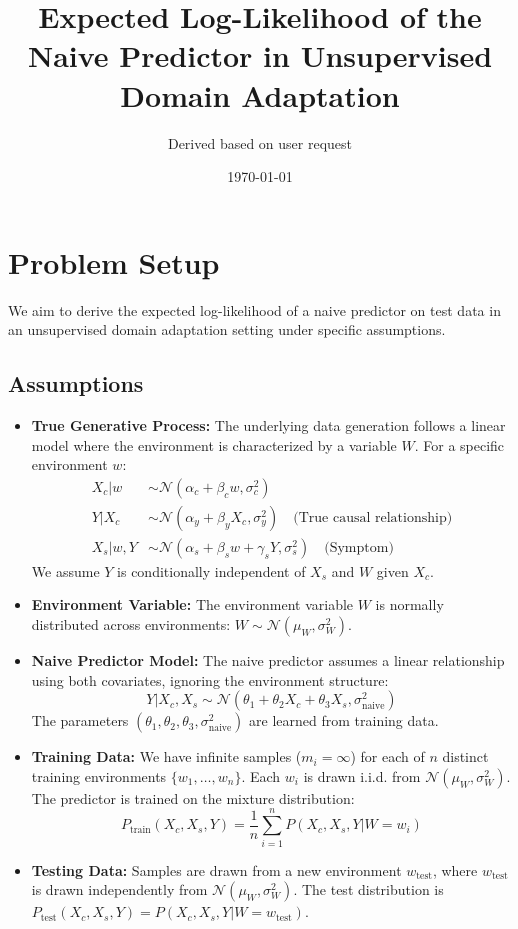 \documentclass{article}
\title{Expected Log-Likelihood of the Naive Predictor in Unsupervised Domain Adaptation}
\author{Derived based on user request}
\date{\today}
\begin{document}
\maketitle

\section{Problem Setup}

We aim to derive the expected log-likelihood of a naive predictor on test data in an unsupervised domain adaptation setting under specific assumptions.

\subsection{Assumptions}
\begin{itemize}
    \item \textbf{True Generative Process:} The underlying data generation follows a linear model where the environment is characterized by a variable $W$. For a specific environment $w$:
        \begin{align*}
            X_c | w &\sim \mathcal{N}(\alpha_c + \beta_c w, \sigma_c^2) \\
            Y | X_c &\sim \mathcal{N}(\alpha_y + \beta_y X_c, \sigma_y^2) \quad \text{(True causal relationship)} \\
            X_s | w, Y &\sim \mathcal{N}(\alpha_s + \beta_s w + \gamma_s Y, \sigma_s^2) \quad \text{(Symptom)}
        \end{align*}
        We assume $Y$ is conditionally independent of $X_s$ and $W$ given $X_c$.
    \item \textbf{Environment Variable:} The environment variable $W$ is normally distributed across environments: $W \sim \mathcal{N}(\mu_W, \sigma_W^2)$.
    \item \textbf{Naive Predictor Model:} The naive predictor assumes a linear relationship using both covariates, ignoring the environment structure:
        \[ Y | X_c, X_s \sim \mathcal{N}(\theta_1 + \theta_2 X_c + \theta_3 X_s, \sigma_{\text{naive}}^2) \]
        The parameters $(\theta_1, \theta_2, \theta_3, \sigma_{\text{naive}}^2)$ are learned from training data.
    \item \textbf{Training Data:} We have infinite samples ($m_i = \infty$) for each of $n$ distinct training environments $\{w_1, \dots, w_n\}$. Each $w_i$ is drawn i.i.d. from $\mathcal{N}(\mu_W, \sigma_W^2)$. The predictor is trained on the mixture distribution:
        \[ P_{\text{train}}(X_c, X_s, Y) = \frac{1}{n} \sum_{i=1}^n P(X_c, X_s, Y | W=w_i) \]
    \item \textbf{Testing Data:} Samples are drawn from a new environment $w_{\text{test}}$, where $w_{\text{test}}$ is drawn independently from $\mathcal{N}(\mu_W, \sigma_W^2)$. The test distribution is $P_{\text{test}}(X_c, X_s, Y) = P(X_c, X_s, Y | W=w_{\text{test}})$.
\end{itemize}
\end{document}
